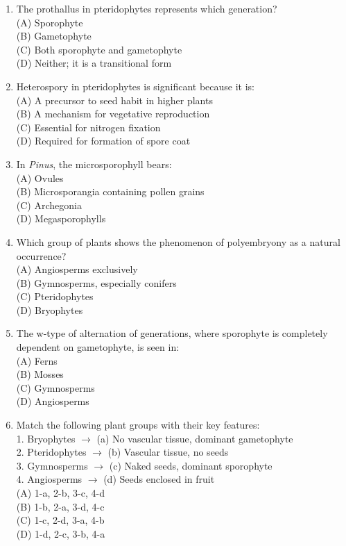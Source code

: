 \documentclass{article}
\begin{document}
\begin{enumerate}[label=Q\arabic*.]
\item The prothallus in pteridophytes represents which generation?
\\(A) Sporophyte
\\(B) Gametophyte
\\(C) Both sporophyte and gametophyte
\\(D) Neither; it is a transitional form

\item Heterospory in pteridophytes is significant because it is:
\\(A) A precursor to seed habit in higher plants
\\(B) A mechanism for vegetative reproduction
\\(C) Essential for nitrogen fixation
\\(D) Required for formation of spore coat

\item In \textit{Pinus}, the microsporophyll bears:
\\(A) Ovules
\\(B) Microsporangia containing pollen grains
\\(C) Archegonia
\\(D) Megasporophylls

\item Which group of plants shows the phenomenon of polyembryony as a natural occurrence?
\\(A) Angiosperms exclusively
\\(B) Gymnosperms, especially conifers
\\(C) Pteridophytes
\\(D) Bryophytes

\item The w-type of alternation of generations, where sporophyte is completely dependent on gametophyte, is seen in:
\\(A) Ferns
\\(B) Mosses
\\(C) Gymnosperms
\\(D) Angiosperms

\item Match the following plant groups with their key features:\\
1. Bryophytes $\rightarrow$ (a) No vascular tissue, dominant gametophyte\\
2. Pteridophytes $\rightarrow$ (b) Vascular tissue, no seeds\\
3. Gymnosperms $\rightarrow$ (c) Naked seeds, dominant sporophyte\\
4. Angiosperms $\rightarrow$ (d) Seeds enclosed in fruit
\\(A) 1-a, 2-b, 3-c, 4-d
\\(B) 1-b, 2-a, 3-d, 4-c
\\(C) 1-c, 2-d, 3-a, 4-b
\\(D) 1-d, 2-c, 3-b, 4-a


\end{enumerate}
\end{document}
